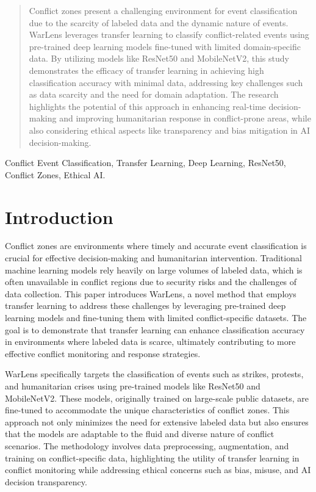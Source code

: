 \documentclass[conference]{IEEEtran}
\begin{document}
\begin{abstract}
Conflict zones present a challenging environment for event classification due to the scarcity of labeled data and the dynamic nature of events. WarLens leverages transfer learning to classify conflict-related events using pre-trained deep learning models fine-tuned with limited domain-specific data. By utilizing models like ResNet50 and MobileNetV2, this study demonstrates the efficacy of transfer learning in achieving high classification accuracy with minimal data, addressing key challenges such as data scarcity and the need for domain adaptation. The research highlights the potential of this approach in enhancing real-time decision-making and improving humanitarian response in conflict-prone areas, while also considering ethical aspects like transparency and bias mitigation in AI decision-making.
\end{abstract}

\begin{IEEEkeywords}
Conflict Event Classification, Transfer Learning, Deep Learning, ResNet50, Conflict Zones, Ethical AI.
\end{IEEEkeywords}

\section{Introduction}
Conflict zones are environments where timely and accurate event classification is crucial for effective decision-making and humanitarian intervention. Traditional machine learning models rely heavily on large volumes of labeled data, which is often unavailable in conflict regions due to security risks and the challenges of data collection. This paper introduces WarLens, a novel method that employs transfer learning to address these challenges by leveraging pre-trained deep learning models and fine-tuning them with limited conflict-specific datasets. The goal is to demonstrate that transfer learning can enhance classification accuracy in environments where labeled data is scarce, ultimately contributing to more effective conflict monitoring and response strategies.

WarLens specifically targets the classification of events such as strikes, protests, and humanitarian crises using pre-trained models like ResNet50 and MobileNetV2. These models, originally trained on large-scale public datasets, are fine-tuned to accommodate the unique characteristics of conflict zones. This approach not only minimizes the need for extensive labeled data but also ensures that the models are adaptable to the fluid and diverse nature of conflict scenarios. The methodology involves data preprocessing, augmentation, and training on conflict-specific data, highlighting the utility of transfer learning in conflict monitoring while addressing ethical concerns such as bias, misuse, and AI decision transparency.
\end{document}
